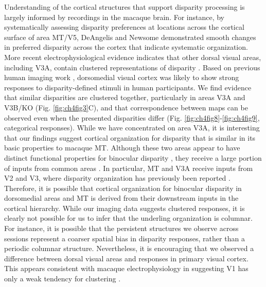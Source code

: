 Understanding of the cortical structures that support disparity processing is largely informed by recordings in the macaque brain. For instance, by systematically assessing disparity preferences at locations across the cortical surface of area MT/V5, DeAngelis and Newsome \cite{DeAngelis:1999fk} demonstrated smooth changes in preferred disparity across the cortex that indicate systematic organization. More recent electrophysiological evidence indicates that other dorsal visual areas, including V3A, contain clustered representations of disparity \cite{Anzai:2011gb,Yeagle_Lafer-Sousa_Conway_2013}. Based on previous human imaging work \cite{Backus:2001ly,Preston:2008dg}, dorsomedial visual cortex was likely to show strong responses to disparity-defined stimuli in human participants. We find evidence that similar disparities are clustered together, particularly in areas V3A and V3B/KO (Fig. \ref{fig:ch4fig3}C), and that correspondence between maps can be observed even when the presented disparities differ (Fig. \ref{fig:ch4fig8}-\ref{fig:ch4fig9}, categorical responses). While we have concentrated on area V3A, it is interesting that our findings suggest cortical organization for disparity that is similar in its basic properties to macaque MT. Although these two areas appear to have distinct functional properties for binocular disparity \cite{Cottereau:2011uq}, they receive a large portion of inputs from common areas \cite{Felleman:1991kg}. In particular, MT and V3A receive inputs from V2 and V3, where disparity organization has previously been reported \cite{Roe:1995ys,Chen:2008vn,Adams:2001wt,Anzai:2011gb}. Therefore, it is possible that cortical organization for binocular disparity in dorsomedial areas and MT is derived from their downstream inputs in the cortical hierarchy.
While our imaging data suggests clustered responses, it is clearly not possible for us to infer that the underling organization is columnar. For instance, it is possible that the persistent structures we observe across sessions represent a coarser spatial bias in disparity responses, rather than a periodic columnar structure. Nevertheless, it is encouraging that we observed a difference between dorsal visual areas and responses in primary visual cortex. This appears consistent with macaque electrophysiology in suggesting V1 has only a weak tendency for clustering \cite{LeVay:1988ve,Prince:2002cr}. 

